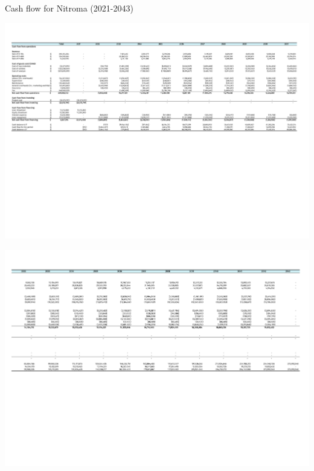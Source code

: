 \newpage
 \begin{landscape}
\begin{table}
\label{tab:CashFlow}
  \caption{Cash flow for Nitroma (2021-2043)}
\includegraphics[clip, trim=0cm 11cm 0cm 1.5cm, width=\linewidth]{chapters/Z-support/attachments/Cash1.pdf}
\end{table} 
\begin{table}[H]
\includegraphics[clip, trim=0cm 8cm 0cm 1.5cm, width=\linewidth]{chapters/Z-support/attachments/Cash2.pdf}
\end{table}
 \end{landscape}
 
